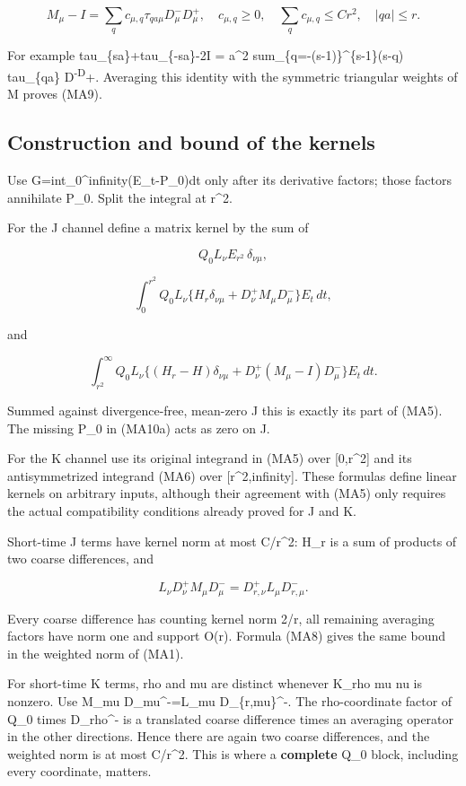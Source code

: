 \documentclass[
  11pt,
]{article}
\begin{document}
\[
M_\mu-I=\sum_q c_{\mu,q}\tau_{qa\mu}D_\mu^-D_\mu^+,
\quad c_{\mu,q}\ge0,\quad\sum_qc_{\mu,q}\le C r^2,
\quad |qa|\le r.
\tag{MA9}
\]

For example tau\_\{sa\}+tau\_\{-sa\}-2I = a\^{}2
sum\_\{q=-(s-1)\}\^{}\{s-1\}(s-\textbar q\textbar) tau\_\{qa\}
D\textsuperscript{-D}+. Averaging this identity with the symmetric
triangular weights of M proves (MA9).

\hypertarget{construction-and-bound-of-the-kernels}{%
\subsection{Construction and bound of the
kernels}\label{construction-and-bound-of-the-kernels}}

Use G=int\_0\^{}infinity(E\_t-P\_0)dt only after its derivative factors;
those factors annihilate P\_0. Split the integral at r\^{}2.

For the J channel define a matrix kernel by the sum of

\[
Q_0L_\nu E_{r^2}\,\delta_{\nu\mu},
\tag{MA10a}
\]

\[
\int_0^{r^2}Q_0L_\nu
\{H_r\delta_{\nu\mu}+D_\nu^+M_\mu D_\mu^-\}E_t\,dt,
\tag{MA10b}
\]

and

\[
\int_{r^2}^\infty Q_0L_\nu
\{(H_r-H)\delta_{\nu\mu}+D_\nu^+(M_\mu-I)D_\mu^-\}E_t\,dt.
\tag{MA10c}
\]

Summed against divergence-free, mean-zero J this is exactly its part of
(MA5). The missing P\_0 in (MA10a) acts as zero on J.

For the K channel use its original integrand in (MA5) over
{[}0,r\^{}2{]} and its antisymmetrized integrand (MA6) over
{[}r\^{}2,infinity{]}. These formulas define linear kernels on arbitrary
inputs, although their agreement with (MA5) only requires the actual
compatibility conditions already proved for J and K.

Short-time J terms have kernel norm at most C/r\^{}2: H\_r is a sum of
products of two coarse differences, and

\[
L_\nu D_\nu^+M_\mu D_\mu^-
=D_{r,\nu}^+L_\mu D_{r,\mu}^-.
\]

Every coarse difference has counting kernel norm 2/r, all remaining
averaging factors have norm one and support O(r). Formula (MA8) gives
the same bound in the weighted norm of (MA1).

For short-time K terms, rho and mu are distinct whenever K\_rho mu nu is
nonzero. Use M\_mu D\_mu\^{}-=L\_mu D\_\{r,mu\}\^{}-. The rho-coordinate
factor of Q\_0 times D\_rho\^{}- is a translated coarse difference times
an averaging operator in the other directions. Hence there are again two
coarse differences, and the weighted norm is at most C/r\^{}2. This is
where a \textbf{complete} Q\_0 block, including every coordinate,
matters.
\end{document}
